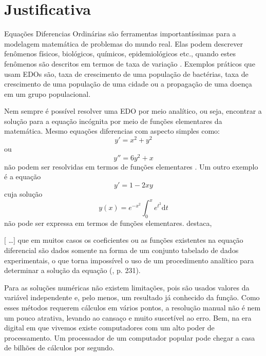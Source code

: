 \section{Justificativa}\label{ljustificativa}

Equações Diferencias Ordinárias são ferramentas importantíssimas 
para a modelagem matemática de problemas do mundo real. Elas podem
descrever fenômenos físicos, biológicos, químicos, epidemiológicos etc.,
quando estes fenômenos são descritos em termos de taxa de variação \cite[p.~293]{filho2007algoritmos}.
Exemplos práticos que usam EDOs são, taxa de crescimento de uma
população de bactérias, taxa de crescimento de uma população de uma
cidade ou a propagação de uma doença em um grupo populacional.

Nem sempre é possível resolver uma EDO por meio analítico, ou seja,
encontrar a solução para a equação incógnita por meio de funções
elementares da matemática. Mesmo equações diferencias com aspecto 
simples como:
\begin{equation*}
y' = x^2 + y^2
\end{equation*}
ou
\begin{equation*}
y'' = 6y^2 + x
\end{equation*} 
não podem ser resolvidas em termos de funções elementares \cite[p.~275]{calculo}.
Um outro exemplo é a equação
\begin{equation*}
y' = 1 - 2xy
\end{equation*}
cuja solução 
\begin{equation*}
y(x) = e^{-x^{2}} \int_0^x\! e^{t^{2}} \mathrm{d}t
\end{equation*}
não pode ser expressa em termos de funções elementares.
 destaca,
\begin{citacao}
$[$ \ldots $]$ que em muitos casos os coeficientes ou as funções existentes  na equação diferencial são
dados somente na forma de um conjunto tabelado de dados experimentais,
o que torna impossível o uso de um procedimento analítico para determinar
a solução da equação (\citeyear{sperandio2003calculo}, p. 231).
\end{citacao}

Para as soluções numéricas não existem limitações, pois são usados valores
da variável independente e, pelo  menos, um resultado já conhecido da função.
Como esses métodos requerem cálculos em vários pontos, a resolução
manual não é nem um pouco atrativa, levando ao cansaço e muito suscetível 
ao erro. Bem, na era digital em que vivemos existe computadores com um
alto poder de processamento. Um processador de um computador 
popular pode chegar a casa de bilhões de cálculos por segundo.

